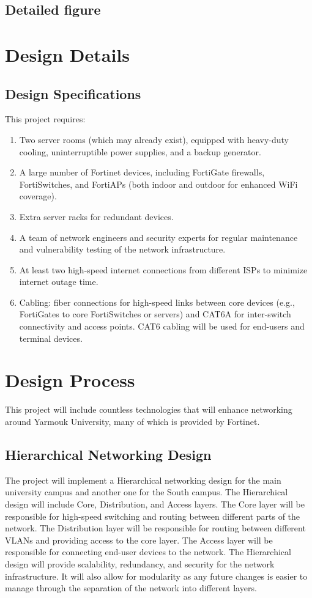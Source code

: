 \documentclass[12pt]{report}
\begin{document}
\subsection{Detailed figure}

\section{Design Details}
\subsection{Design Specifications}
This project requires:
\begin{enumerate}
    \item Two server rooms (which may already exist), equipped with heavy-duty cooling, uninterruptible power supplies, and a backup generator.
    \item A large number of Fortinet devices, including FortiGate firewalls, FortiSwitches, and FortiAPs (both indoor and outdoor for enhanced WiFi coverage).
    \item Extra server racks for redundant devices.
    \item A team of network engineers and security experts for regular maintenance and vulnerability testing of the network infrastructure.
    \item At least two high-speed internet connections from different ISPs to minimize internet outage time.
    \item Cabling: fiber connections for high-speed links between core devices (e.g., FortiGates to core FortiSwitches or servers) and CAT6A for inter-switch connectivity and access points. CAT6 cabling will be used for end-users and terminal devices.
\end{enumerate}

\section{Design Process}
This project will include countless technologies that will enhance networking around Yarmouk University, many of which is provided by Fortinet.
\subsection{Hierarchical Networking Design}
The project will implement a Hierarchical networking design for the main university campus and another one for the South campus. The Hierarchical design will include Core, Distribution, and Access layers. The Core layer will be responsible for high-speed switching and routing between different parts of the network. The Distribution layer will be responsible for routing between different VLANs and providing access to the core layer. The Access layer will be responsible for connecting end-user devices to the network. The Hierarchical design will provide scalability, redundancy, and security for the network infrastructure. It will also allow for modularity as any future changes is easier to manage through the separation of the network into different layers.\cite{HeirNWDes}
\end{document}
